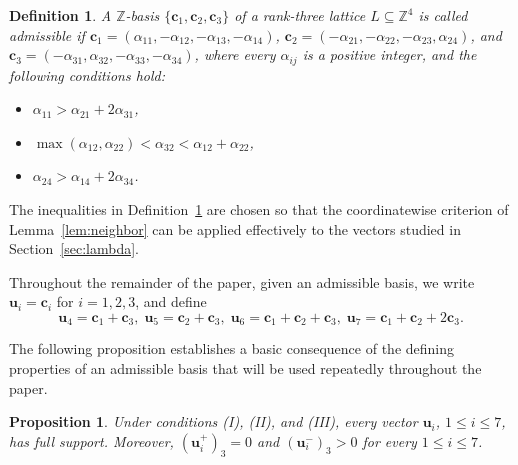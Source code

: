 \documentclass[10pt,a4paper]{amsart}
\newtheorem{proposition}[theorem]{Proposition}
\newtheorem{definition}[theorem]{Definition}
\begin{document}
\begin{definition}\label{def:setup} A $\mathbb Z$-basis
$\{\mathbf c_1,\mathbf c_2,\mathbf c_3\}$ of a rank-three lattice
$L\subseteq\mathbb Z^4$ is called \emph{admissible} if $\mathbf c_1=(\alpha_{11},-\alpha_{12},-\alpha_{13},-\alpha_{14})$,
$\mathbf c_2=(-\alpha_{21},-\alpha_{22},-\alpha_{23},\alpha_{24})$, and
$\mathbf c_3=(-\alpha_{31},\alpha_{32},-\alpha_{33},-\alpha_{34})$,
where every $\alpha_{ij}$ is a positive integer, and the following conditions hold:
\begin{itemize}
\item[\textbf{(I)}]
$\alpha_{11}>\alpha_{21}+2\alpha_{31}$,
\item[\textbf{(II)}]
$\max(\alpha_{12},\alpha_{22})<\alpha_{32}
<\alpha_{12}+\alpha_{22}$,
\item[\textbf{(III)}]
$\alpha_{24}>\alpha_{14}+2\alpha_{34}$.
\end{itemize}

\end{definition}

The inequalities in Definition~\ref{def:setup} are chosen so that the
coordinatewise criterion of Lemma~\ref{lem:neighbor} can be applied
effectively to the vectors studied in
Section~\ref{sec:lambda}.

Throughout the remainder of the paper, given an admissible basis, we
write $\mathbf u_i=\mathbf c_i$ for $i=1,2,3$, and define
\[
\mathbf u_4=\mathbf c_1+\mathbf c_3,\;
\mathbf u_5=\mathbf c_2+\mathbf c_3,\;
\mathbf u_6=\mathbf c_1+\mathbf c_2+\mathbf c_3,\;
\mathbf u_7=\mathbf c_1+\mathbf c_2+2\mathbf c_3.
\]

The following proposition establishes a basic consequence of the
defining properties of an admissible basis that will be used
repeatedly throughout the paper.

\begin{proposition}\label{prop:full-support} Under conditions
\textup{(I)}, \textup{(II)}, and \textup{(III)}, every vector $\mathbf u_i$, $1\le i\le7$, has full support. Moreover, $(\mathbf u_i^+)_3=0$ and $(\mathbf u_i^-)_3>0$ for every $1 \leq i \leq 7$.
\end{proposition}
\end{document}
